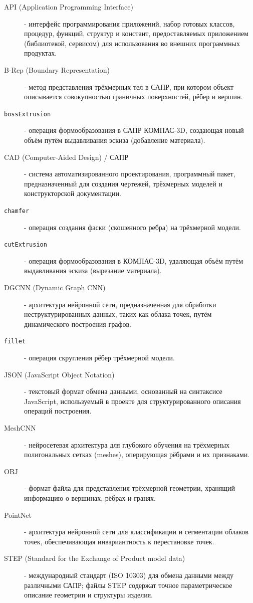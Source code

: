 

\begin{description}
    \item[API (Application Programming Interface)] - интерфейс программирования приложений, набор готовых классов, процедур, функций, структур и констант, предоставляемых приложением (библиотекой, сервисом) для использования во внешних программных продуктах.
    \item[B-Rep (Boundary Representation)] - метод представления трёхмерных тел в САПР, при котором объект описывается совокупностью граничных поверхностей, рёбер и вершин.
    \item[\texttt{bossExtrusion}] - операция формообразования в САПР КОМПАС-3D, создающая новый объём путём выдавливания эскиза (добавление материала).
    \item[CAD (Computer-Aided Design) / САПР] - система автоматизированного проектирования, программный пакет, предназначенный для создания чертежей, трёхмерных моделей и конструкторской документации.
    \item[\texttt{chamfer}] - операция создания фаски (скошенного ребра) на трёхмерной модели.
    \item[\texttt{cutExtrusion}] - операция формообразования в КОМПАС-3D, удаляющая объём путём выдавливания эскиза (вырезание материала).
    \item[DGCNN (Dynamic Graph CNN)] - архитектура нейронной сети, предназначенная для обработки неструктурированных данных, таких как облака точек, путём динамического построения графов.
    \item[\texttt{fillet}] - операция скругления рёбер трёхмерной модели.
    \item[JSON (JavaScript Object Notation)] - текстовый формат обмена данными, основанный на синтаксисе JavaScript, используемый в проекте для структурированного описания операций построения.
    \item[MeshCNN] - нейросетевая архитектура для глубокого обучения на трёхмерных полигональных сетках (meshes), оперирующая рёбрами и их признаками.
    \item[OBJ] - формат файла для представления трёхмерной геометрии, хранящий информацию о вершинах, рёбрах и гранях.
    \item[PointNet] - архитектура нейронной сети для классификации и сегментации облаков точек, обеспечивающая инвариантность к перестановке точек.
    \item[STEP (Standard for the Exchange of Product model data)] - международный стандарт (ISO 10303) для обмена данными между различными САПР; файлы STEP содержат точное параметрическое описание геометрии и структуры изделия.

\end{description}
